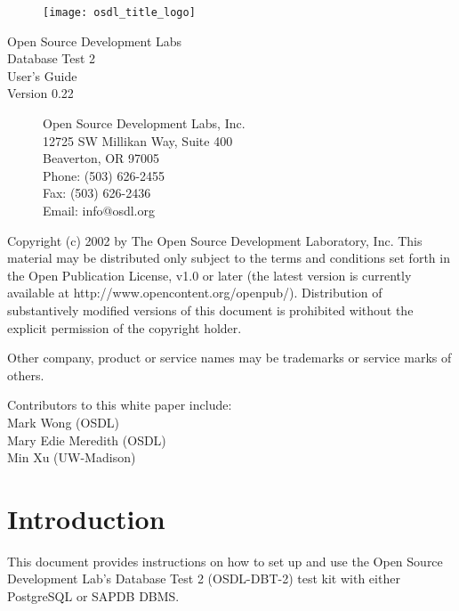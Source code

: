 \documentclass{article}
\begin{document}
\begin{titlepage}

\begin{figure}[t]
\centering
\texttt{[image: osdl\_title\_logo]}
\end{figure}

\centering
\huge
Open Source Development Labs \\
Database Test 2 \\
\Huge
User's Guide \\
\LARGE
Version 0.22

\begin{figure}[b]
\flushleft
\normalsize
Open Source Development Labs, Inc. \\
12725 SW Millikan Way, Suite 400 \\
Beaverton, OR 97005 \\
Phone: (503) 626-2455 \\
Fax: (503) 626-2436 \\
Email: info@osdl.org
\end{figure}

\end{titlepage}

\noindent
Copyright (c) 2002 by The Open Source Development Laboratory, Inc. This
material may be distributed only subject to the terms and conditions set forth
in the Open Publication License, v1.0 or later (the latest version is currently
available at http://www.opencontent.org/openpub/). Distribution of
substantively modified versions of this document is prohibited without the
explicit permission of the copyright holder.

\noindent
Other company, product or service names may be trademarks or service marks of
others.

\noindent
Contributors to this white paper include: \\
\indent Mark Wong (OSDL) \\
\indent Mary Edie Meredith (OSDL) \\
\indent Min Xu (UW-Madison)

\pagebreak

\section{Introduction}

This document provides instructions on how to set up and use the Open Source
Development Lab's Database Test 2 (OSDL-DBT-2) test kit with either PostgreSQL
or SAPDB DBMS.
\end{document}
